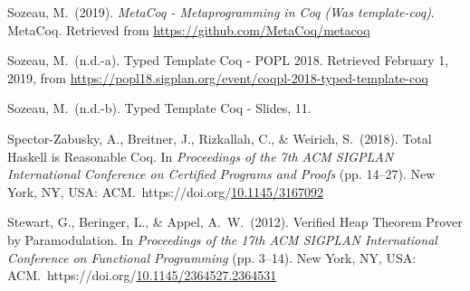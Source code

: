 \documentclass[12pt,twoside]{article}
\begin{document}
{\begin{thebibliography}{222}
\mdbibitemlabel{}Sozeau, M.~(2019). \emph{MetaCoq - Metaprogramming in Coq (Was template-coq)}. MetaCoq. Retrieved from \href{https://github.com/MetaCoq/metacoq}{{\ttfamily https://\hspace{0pt}github.\hspace{0pt}com/\hspace{0pt}MetaCoq/\hspace{0pt}metacoq}}\label{sozeau_metacoq_2019}%

\mdbibitemlabel{}Sozeau, M.~(n.d.-a). Typed Template Coq - POPL 2018. Retrieved February 1, 2019, from \href{https://popl18.sigplan.org/event/coqpl-2018-typed-template-coq}{{\ttfamily https://\hspace{0pt}popl18.\hspace{0pt}sigplan.\hspace{0pt}org/\hspace{0pt}event/\hspace{0pt}coqpl-\hspace{0pt}2018-\hspace{0pt}typed-\hspace{0pt}template-\hspace{0pt}coq}}\label{sozeau_typed_nodate}%

\mdbibitemlabel{}Sozeau, M.~(n.d.-b). Typed Template Coq - Slides, 11.\label{sozeau_typed_nodate-1}%

\mdbibitemlabel{}Spector-Zabusky, A., Breitner, J., Rizkallah, C., \& Weirich, S.~(2018). Total Haskell is Reasonable Coq. In \emph{Proceedings of the 7th ACM SIGPLAN International Conference on Certified Programs and Proofs} (pp. 14–27). New York, NY, USA: ACM.~https://doi.org/\href{https://dx.doi.org/10.1145/3167092}{10.1145/3167092}\label{spector-zabusky_total_2018}%

\mdbibitemlabel{}Stewart, G., Beringer, L., \& Appel, A.~W.~(2012). Verified Heap Theorem Prover by Paramodulation. In \emph{Proceedings of the 17th ACM SIGPLAN International Conference on Functional Programming} (pp. 3–14). New York, NY, USA: ACM.~https://doi.org/\href{https://dx.doi.org/10.1145/2364527.2364531}{10.1145/2364527.2364531}\label{stewart_verified_2012}%


\end{thebibliography}}
\end{document}
